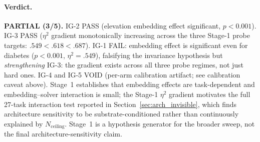 \documentclass{article}
\begin{document}

\paragraph{Verdict.} \textbf{PARTIAL (3/5).} IG-2 PASS (elevation embedding effect significant, $p < 0.001$). IG-3 PASS ($\eta^2$ gradient monotonically increasing across the three Stage-1 probe targets: $.549 < .618 < .687$). IG-1 FAIL: embedding effect is significant even for diabetes ($p < 0.001$, $\eta^2 = .549$), falsifying the invariance hypothesis but \emph{strengthening} IG-3: the gradient exists across all three probe regimes, not just hard ones. IG-4 and IG-5 VOID (per-arm calibration artifact; see calibration caveat above). Stage~1 establishes that embedding effects are task-dependent and embedding--solver interaction is small; the Stage-1 $\eta^2$ gradient motivates the full 27-task interaction test reported in Section~\ref{sec:arch_invisible}, which finds architecture sensitivity to be substrate-conditioned rather than continuously explained by $N_{\text{ceiling}}$. Stage~1 is a hypothesis generator for the broader sweep, not the final architecture-sensitivity claim.
\end{document}
